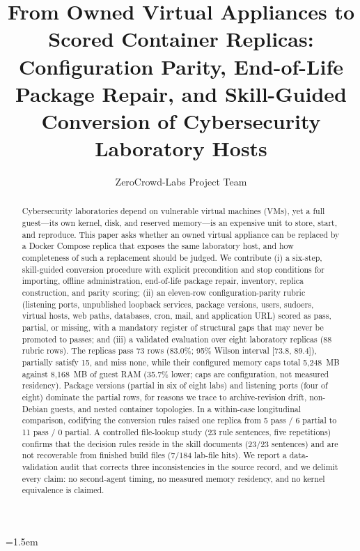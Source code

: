 \documentclass[3p,twocolumn,authoryear]{elsarticle}
\begin{document}
\emergencystretch=1.5em
\renewcommand{\topfraction}{0.92}
\renewcommand{\bottomfraction}{0.85}
\renewcommand{\textfraction}{0.06}
\renewcommand{\floatpagefraction}{0.75}
\renewcommand{\dbltopfraction}{0.92}
\renewcommand{\dblfloatpagefraction}{0.75}
\setcounter{topnumber}{4}
\setcounter{dbltopnumber}{4}
\setcounter{totalnumber}{6}

\begin{frontmatter}

\title{From Owned Virtual Appliances to Scored Container Replicas:\\
Configuration Parity, End-of-Life Package Repair, and Skill-Guided
Conversion of Cybersecurity Laboratory Hosts}

\author{ZeroCrowd-Labs Project Team}
\address{ZeroCrowd-Labs open research artifact repository\\
\textit{Corresponding author to be named on submission.}}

\begin{abstract}
Cybersecurity laboratories depend on vulnerable virtual machines (VMs),
yet a full guest---its own kernel, disk, and reserved memory---is an
expensive unit to store, start, and reproduce. This paper asks whether
an owned virtual appliance can be replaced by a Docker Compose replica
that exposes the same laboratory host, and how completeness of such a
replacement should be judged. We contribute (i) a six-step,
skill-guided conversion procedure with explicit precondition and stop
conditions for importing, offline administration, end-of-life package
repair, inventory, replica construction, and parity scoring; (ii) an
eleven-row configuration-parity rubric (listening ports, unpublished
loopback services, package versions, users, sudoers, virtual hosts, web
paths, databases, cron, mail, and application URL) scored as pass,
partial, or missing, with a mandatory register of structural gaps that
may never be promoted to passes; and (iii) a validated evaluation over
eight laboratory replicas (88 rubric rows). The replicas pass 73 rows
(83.0\%; 95\% Wilson interval [73.8, 89.4]), partially satisfy 15, and
miss none, while their configured memory caps total 5,248~MB against
8,168~MB of guest RAM (35.7\% lower; caps are configuration, not measured
residency). Package versions (partial in six of eight labs) and
listening ports (four of eight) dominate the partial rows, for reasons
we trace to archive-revision drift, non-Debian guests, and nested
container topologies. In a within-case longitudinal comparison, codifying
the conversion rules raised one replica from 5 pass / 6 partial to
11 pass / 0 partial. A controlled file-lookup study (23 rule sentences,
five repetitions) confirms that the decision rules reside in the skill
documents (23/23 sentences) and are not recoverable from finished build
files (7/184 lab-file hits). We report a data-validation audit that
corrects three inconsistencies in the source record, and we delimit
every claim: no second-agent timing, no measured memory residency, and
no kernel equivalence is claimed.
\end{abstract}


\end{frontmatter}
\end{document}
